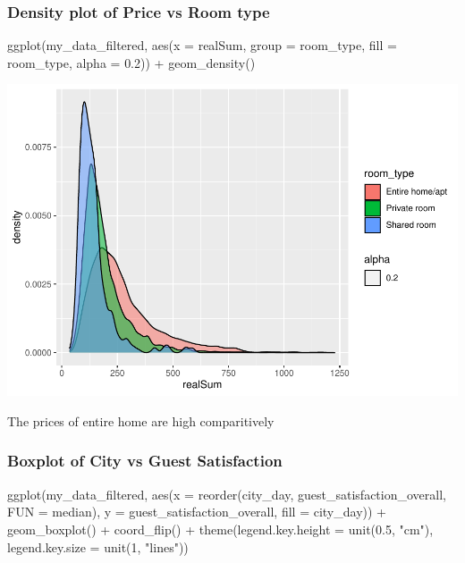 \documentclass[
]{article}
\newenvironment{Shaded}{\begin{snugshade}}{\end{snugshade}}
\newcommand{\AttributeTok}[1]{\textcolor[rgb]{0.77,0.63,0.00}{#1}}
\newcommand{\DecValTok}[1]{\textcolor[rgb]{0.00,0.00,0.81}{#1}}
\newcommand{\FloatTok}[1]{\textcolor[rgb]{0.00,0.00,0.81}{#1}}
\newcommand{\FunctionTok}[1]{\textcolor[rgb]{0.00,0.00,0.00}{#1}}
\newcommand{\NormalTok}[1]{#1}
\newcommand{\SpecialCharTok}[1]{\textcolor[rgb]{0.00,0.00,0.00}{#1}}
\newcommand{\StringTok}[1]{\textcolor[rgb]{0.31,0.60,0.02}{#1}}
\begin{document}
\hypertarget{density-plot-of-price-vs-room-type}{%
\subsubsection{Density plot of Price vs Room
type}\label{density-plot-of-price-vs-room-type}}

\begin{Shaded}
\begin{Highlighting}[]
\FunctionTok{ggplot}\NormalTok{(my\_data\_filtered, }\FunctionTok{aes}\NormalTok{(}\AttributeTok{x =}\NormalTok{ realSum, }\AttributeTok{group =}\NormalTok{ room\_type,}
    \AttributeTok{fill =}\NormalTok{ room\_type, }\AttributeTok{alpha =} \FloatTok{0.2}\NormalTok{)) }\SpecialCharTok{+} \FunctionTok{geom\_density}\NormalTok{()}
\end{Highlighting}
\end{Shaded}

\includegraphics{Project_files/figure-latex/unnamed-chunk-6-1.pdf}

The prices of entire home are high comparitively

\hypertarget{boxplot-of-city-vs-guest-satisfaction}{%
\subsubsection{Boxplot of City vs Guest
Satisfaction}\label{boxplot-of-city-vs-guest-satisfaction}}

\begin{Shaded}
\begin{Highlighting}[]
\FunctionTok{ggplot}\NormalTok{(my\_data\_filtered, }\FunctionTok{aes}\NormalTok{(}\AttributeTok{x =} \FunctionTok{reorder}\NormalTok{(city\_day, guest\_satisfaction\_overall,}
    \AttributeTok{FUN =}\NormalTok{ median), }\AttributeTok{y =}\NormalTok{ guest\_satisfaction\_overall, }\AttributeTok{fill =}\NormalTok{ city\_day)) }\SpecialCharTok{+}
    \FunctionTok{geom\_boxplot}\NormalTok{() }\SpecialCharTok{+} \FunctionTok{coord\_flip}\NormalTok{() }\SpecialCharTok{+} \FunctionTok{theme}\NormalTok{(}\AttributeTok{legend.key.height =} \FunctionTok{unit}\NormalTok{(}\FloatTok{0.5}\NormalTok{,}
    \StringTok{"cm"}\NormalTok{), }\AttributeTok{legend.key.size =} \FunctionTok{unit}\NormalTok{(}\DecValTok{1}\NormalTok{, }\StringTok{"lines"}\NormalTok{))}
\end{Highlighting}
\end{Shaded}
\end{document}
